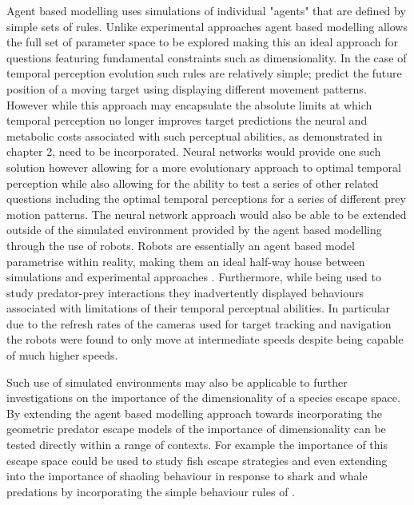 Agent based modelling uses simulations of individual "agents" that are defined by simple sets of rules. Unlike experimental approaches agent based modelling allows the full set of parameter space to be explored making this an ideal approach for questions featuring fundamental constraints such as dimensionality. In the case of temporal perception evolution such rules are relatively simple; predict the future position of a moving target using displaying different movement patterns. However while this approach may encapsulate the absolute limits at which temporal perception no longer improves target predictions the neural and metabolic costs associated with such perceptual abilities, as demonstrated in chapter 2, need to be incorporated. Neural networks would provide one such solution however allowing for a more evolutionary approach to optimal temporal perception while also allowing for the ability to test a series of other related questions including the optimal temporal perceptions for a series of different prey motion patterns. The neural network approach would also be able to be extended outside of the simulated environment provided by the agent based modelling through the use of robots. Robots are essentially an agent based model parametrise within reality, making them an ideal half-way house between simulations and experimental approaches \citep{floreano2010evolution}. Furthermore, while being used to study predator-prey interactions they inadvertently displayed behaviours associated with limitations of their temporal perceptual abilities. In particular due to the refresh rates of the cameras used for target tracking and navigation the robots were found to only move at intermediate speeds despite being capable of much higher speeds.


Such use of simulated environments may also be applicable to further investigations on the importance of the dimensionality of a species escape space. By extending the agent based modelling approach towards incorporating the geometric predator escape models of \cite{howland1974optimal} the importance of dimensionality can be tested directly within a range of contexts. For example the importance of this escape space could be used to study fish escape strategies \citep{domenici1997kinematics} and even extending into the importance of shaoling behaviour in response to shark and whale predations by incorporating the simple behaviour rules of \citep{couzin2002collective}.

